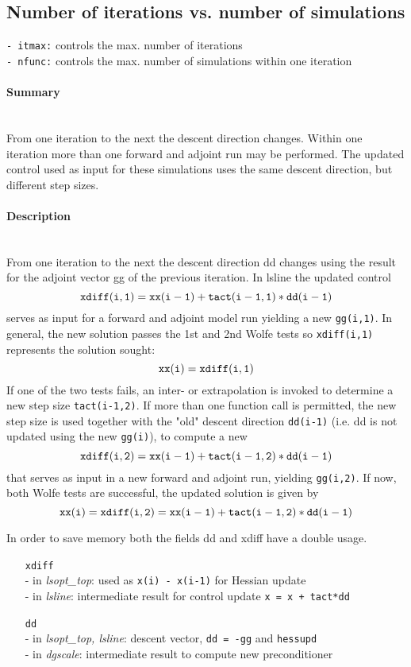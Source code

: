 \subsection{Number of iterations vs. number of simulations}

{\tt - itmax:} controls the max. number of iterations \\
{\tt - nfunc:} controls the max. number of simulations 
within one iteration

\paragraph{Summary} ~ \\
From one iteration to the next the descent direction changes.
Within one iteration more than one forward and adjoint 
run may be performed.
The updated control used as input for these simulations uses the same
descent direction, but different step sizes.

\paragraph{Description} ~ \\
From one iteration to the next the descent direction dd changes using
the result for the adjoint vector gg of the previous iteration.
In lsline the updated control
\[
\tt
xdiff(i,1) = xx(i-1) + tact(i-1,1)*dd(i-1)
\]
serves as input for
a forward and adjoint model run yielding a new {\tt gg(i,1)}.
In general, the new solution passes the 1st and 2nd Wolfe tests 
so {\tt xdiff(i,1)} represents the solution sought:
\[ 
{\tt xx(i) = xdiff(i,1)}
\]
If one of the two tests fails, 
an inter- or extrapolation is invoked to determine
a new step size {\tt tact(i-1,2)}.
If more than one function call is permitted, 
the new step size is used together
with the "old" descent direction {\tt dd(i-1)}
(i.e. dd is not updated using the new {\tt gg(i)}),
to compute a new 
\[
{\tt xdiff(i,2) = xx(i-1) + tact(i-1,2)*dd(i-1)} 
\]
that serves as input
in a new forward and adjoint run, yielding {\tt gg(i,2)}.
If now, both Wolfe tests are successful, 
the updated solution is given by
\[
\tt
xx(i) = xdiff(i,2) = xx(i-1) + tact(i-1,2)*dd(i-1)
\]

In order to save memory both the fields dd and xdiff 
have a double usage.
%
\begin{itemize}
%
\item [{\tt xdiff}] ~\\
- in {\it lsopt\_top}: used as {\tt x(i) - x(i-1)} for Hessian update \\
- in {\it lsline}:    intermediate result for control update 
{\tt x = x + tact*dd}
%
\item [{\tt dd}] ~\\
- in {\it lsopt\_top, lsline}: descent vector, {\tt dd = -gg} 
and {\tt hessupd} \\
- in {\it dgscale}: intermediate result to compute new preconditioner
%
\end{itemize}


